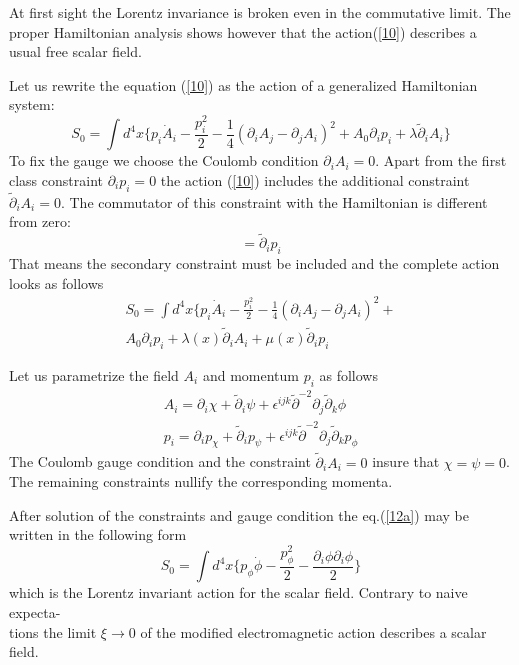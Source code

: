 \documentclass[a4paper,12pt]{article}
\begin{document}
At first sight the Lorentz invariance is broken even in the commutative 
limit. The proper Hamiltonian analysis shows however that the 
action(\ref{10}) describes a usual free scalar field.

Let us rewrite the equation (\ref{10}) as the action of a generalized
Hamiltonian system:
\begin{equation} 
S_0= \int d^4x \{p_i \dot A_i- \frac{p_i^2}{2}- 
\frac{1}{4}(\partial_iA_j-\partial_jA_i)^2+A_0 \partial_ip_i+ \lambda 
\tilde{\partial}_iA_i \}
\label{11} 
 \end{equation} 
 To fix the gauge we choose the Coulomb condition $\partial_iA_i=0$. Apart 
 from the first class constraint $\partial_ip_i=0$ the 
action (\ref{10}) includes the additional constraint 
$\tilde{\partial}_iA_i=0$. The commutator of this constraint with the 
Hamiltonian is different from zero:
\begin{equation} 
[ \int dx \frac{p_i^2}{2}, \theta_{ij} \partial_i A_j]= \tilde{\partial}_i 
p_i 
\label{12} 
\end{equation} 
That means the secondary constraint must be included and the complete 
action looks as follows
\begin{eqnarray}
S_0= \int d^4x \{p_i \dot A_i- \frac{p_i^2}{2}- \frac{1}{4}(\partial_iA_j- 
\partial_jA_i)^2+\nonumber\\
A_0 \partial_i p_i+ \lambda(x) \tilde{\partial}_iA_i+ \mu(x) 
\tilde{\partial}_ip_i 
\label{12a}
\end{eqnarray}

Let us parametrize the field $A_i$ and momentum $p_i$ as follows
\begin{eqnarray}
A_i= \partial_i \chi+ \tilde{\partial}_i \psi+ 
\epsilon^{ijk} \tilde{\partial}^{-2} \partial_j \tilde{\partial}_k \phi 
 \nonumber\\ p_i= \partial_i p_{\chi}+ \tilde{\partial}_i p_{\psi}+ 
 \epsilon^{ijk} \tilde{\partial}^{-2} \partial_j \tilde{\partial}_k 
p_{\phi} \label{13} \end{eqnarray} The Coulomb gauge condition and the 
constraint $\tilde{\partial}_iA_i=0$ insure that $\chi= \psi=0$.  The 
remaining constraints nullify the corresponding momenta.

After solution of the constraints and gauge condition the eq.(\ref{12a}) 
may be written in the following form 
\begin{equation}
S_0= \int d^4x \{p_{\phi} \dot \phi- \frac{p_{\phi}^2}{2}- 
 \frac{\partial_i\phi \partial_i \phi}{2}\}
\label{14} 
\end{equation}
which is the Lorentz invariant action for the scalar field. Contrary to 
 naive expecta-\\tions the limit $\xi \rightarrow 0$ of the modified 
electromagnetic action describes a scalar field.
\end{document}
